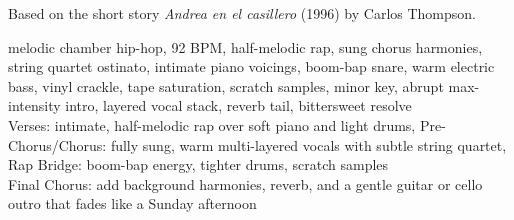 
\begin{notes}
Based on the short story \emph{Andrea en el casillero} (1996) by Carlos Thompson.
\end{notes}
\begin{style}
melodic chamber hip-hop, 92 BPM, half-melodic rap, sung chorus harmonies, string quartet ostinato, intimate piano voicings, boom-bap snare, warm electric bass, vinyl crackle, tape saturation, scratch samples, minor key, abrupt max-intensity intro, layered vocal stack, reverb tail, bittersweet resolve\\
Verses: intimate, half-melodic rap over soft piano and light drums, Pre-Chorus/Chorus: fully sung, warm multi-layered vocals with subtle string quartet, Rap Bridge: boom-bap energy, tighter drums, scratch samples\\
Final Chorus: add background harmonies, reverb, and a gentle guitar or cello outro that fades like a Sunday afternoon
\end{style}
